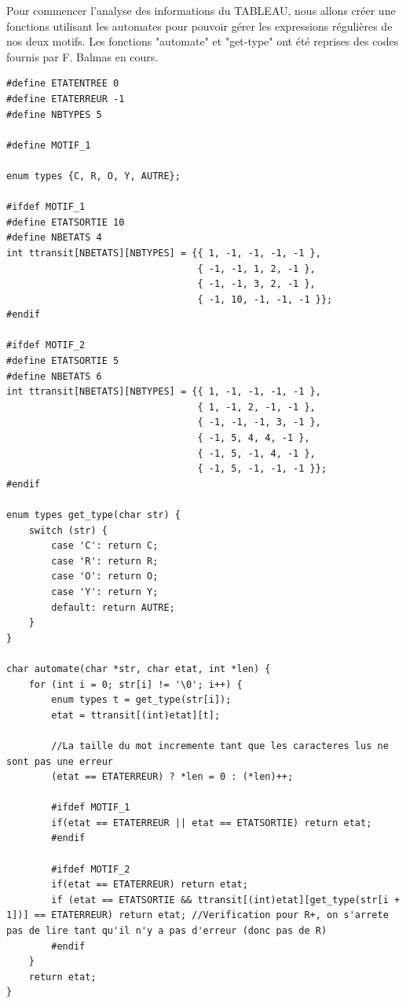 \documentclass{article}
\begin{document}
Pour commencer l'analyse des informations du TABLEAU, nous allons créer une fonctions utilisant les automates pour pouvoir gérer les expressions régulières de nos deux motifs. Les fonctions "automate" et "get-type" ont été reprises des codes fournis par F. Balmas en cours.\newline

\begin{lstlisting}[style=Cstyle]
#define ETATENTREE 0
#define ETATERREUR -1
#define NBTYPES 5

#define MOTIF_1

enum types {C, R, O, Y, AUTRE};

#ifdef MOTIF_1
#define ETATSORTIE 10
#define NBETATS 4
int ttransit[NBETATS][NBTYPES] = {{ 1, -1, -1, -1, -1 },
                                  { -1, -1, 1, 2, -1 },
                                  { -1, -1, 3, 2, -1 },
                                  { -1, 10, -1, -1, -1 }};
#endif

#ifdef MOTIF_2
#define ETATSORTIE 5
#define NBETATS 6
int ttransit[NBETATS][NBTYPES] = {{ 1, -1, -1, -1, -1 },
                                  { 1, -1, 2, -1, -1 },
                                  { -1, -1, -1, 3, -1 },
                                  { -1, 5, 4, 4, -1 },
                                  { -1, 5, -1, 4, -1 },
                                  { -1, 5, -1, -1, -1 }};
#endif

enum types get_type(char str) {
    switch (str) {
        case 'C': return C;
        case 'R': return R;
        case 'O': return O;
        case 'Y': return Y;
        default: return AUTRE;
    }
}

char automate(char *str, char etat, int *len) {
    for (int i = 0; str[i] != '\0'; i++) {
        enum types t = get_type(str[i]);
        etat = ttransit[(int)etat][t];

        //La taille du mot incremente tant que les caracteres lus ne sont pas une erreur
        (etat == ETATERREUR) ? *len = 0 : (*len)++;

        #ifdef MOTIF_1
        if(etat == ETATERREUR || etat == ETATSORTIE) return etat;
        #endif

        #ifdef MOTIF_2
        if(etat == ETATERREUR) return etat;
        if (etat == ETATSORTIE && ttransit[(int)etat][get_type(str[i + 1])] == ETATERREUR) return etat; //Verification pour R+, on s'arrete pas de lire tant qu'il n'y a pas d'erreur (donc pas de R)
        #endif
    }
    return etat;
}
\end{lstlisting}
\newline
\end{document}
